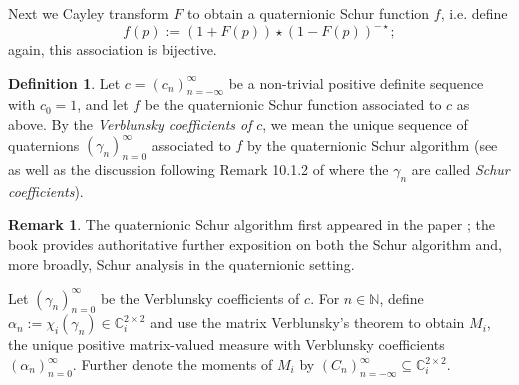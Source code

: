 \documentclass[11pt,reqno]{amsart}
\def\a{\alpha}
\def\x{\chi}
\def\g{\gamma}
\def\NN{\mathbb{N}}
\def\CC{\mathbb{C}}
\theoremstyle{definition}
\newtheorem{definition}[theorem]{Definition}
\newtheorem{remark}[theorem]{Remark}
\numberwithin{equation}{section}
\begin{document}
Next we Cayley transform \(F\) to obtain a quaternionic Schur function \(f\), i.e. define
\[
    f(p) := (1 + F(p)) \star (1 - F(p))^{-\star};
\]
again, this association is bijective. 

\begin{definition}
    Let \(c = (c_n)_{n=-\infty}^{\infty}\) be a non-trivial positive definite sequence with \(c_0 = 1\), and let \(f\) be the quaternionic Schur function associated to \(c\) as above. By the \emph{Verblunsky coefficients of} \(c\), we mean the unique sequence of quaternions \((\g_n)_{n=0}^{\infty}\) associated to \(f\) by the quaternionic Schur algorithm (see \cite{ACS16b} as well as the discussion following Remark 10.1.2 of \cite{ACS16a} where the \(\g_n\) are called \emph{Schur coefficients}).
\end{definition}

\begin{remark}
    The quaternionic Schur algorithm first appeared in the paper \cite{ACS16b}; the book \cite{ACS16a} provides authoritative further exposition on both the Schur algorithm and, more broadly, Schur analysis in the quaternionic setting.
\end{remark}

Let \((\g_n)_{n=0}^{\infty}\) be the Verblunsky coefficients of \(c\). For \(n\in\NN\), define \(\a_n := \x_i(\g_n) \in \CC_i^{2\times 2}\) and use the matrix Verblunsky's theorem \cite[Theorem 3.12]{DPS08} to obtain \(M_i\), the unique positive matrix-valued measure with Verblunsky coefficients \((\a_n)_{n=0}^{\infty}\). Further denote the moments of \(M_i\) by \((C_n)_{n=-\infty}^{\infty} \subseteq \CC_i^{2\times2}\).
\end{document}
